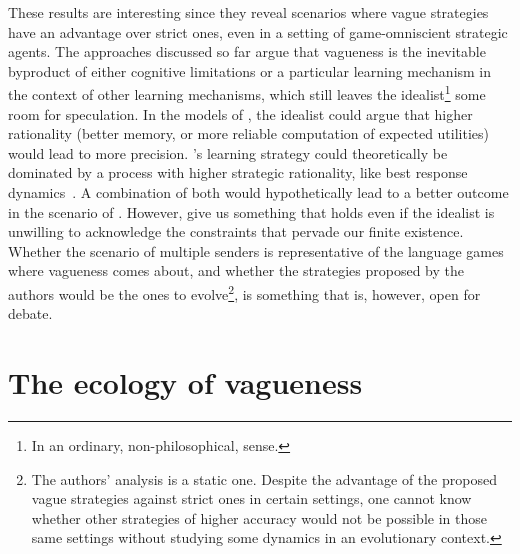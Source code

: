 \documentclass[a4paper]{article}
\begin{document}
These results are interesting since they reveal scenarios where vague strategies have an advantage over strict ones, even in a setting of game-omniscient strategic agents.
The approaches discussed so far argue that vagueness is the inevitable byproduct of either cognitive limitations or a particular learning mechanism in the context of other learning mechanisms, which still leaves the idealist\footnote{In an ordinary, non-philosophical, sense.} some room for speculation.
In the models of \citeauthor{franke_vagueness_2011}, the idealist could argue that higher rationality (better memory, or more reliable computation of expected utilities) would lead to more precision.
\citeauthor{oconnor_evolving_2015}'s learning strategy could theoretically be dominated by a process with higher strategic rationality, like best response dynamics~\parencite{gilboa_social_1991}.
A combination of both would hypothetically lead to a better outcome in the scenario of \citeauthor{franke_vagueness_2017}.
However, \citeauthor{lawry_vagueness_2017} give us something that holds even if the idealist is unwilling to acknowledge the constraints that pervade our finite existence.
Whether the scenario of multiple senders is representative of the language games where vagueness comes about, and whether the strategies proposed by the authors would be the ones to evolve\footnote{The authors' analysis is a static one. Despite the advantage of the proposed vague strategies against strict ones in certain settings, one cannot know whether other strategies of higher accuracy would not be possible in those same settings without studying some dynamics in an evolutionary context.}, is something that is, however, open for debate.


\section{The ecology of vagueness}
\label{sec:ecology-of-vagueness}
\end{document}
